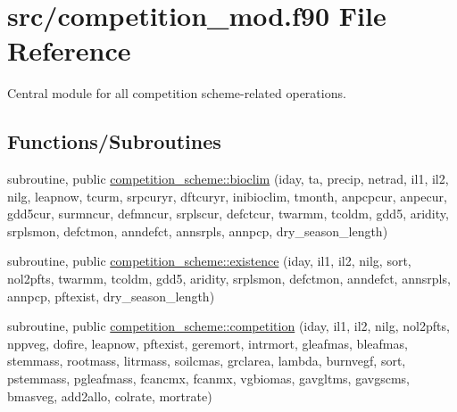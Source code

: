 \hypertarget{competition__mod_8f90}{}\section{src/competition\+\_\+mod.f90 File Reference}
\label{competition__mod_8f90}


Central module for all competition scheme-\/related operations.  


\subsection*{Functions/\+Subroutines}
{\bf }\par
\begin{DoxyCompactItemize}
\item 
subroutine, public \hyperlink{group__competition__scheme__bioclim_ga8976936d6f76c8619f6602153b8355f9}{competition\+\_\+scheme\+::bioclim} (iday, ta, precip, netrad, il1, il2, nilg, leapnow, tcurm, srpcuryr, dftcuryr, inibioclim, tmonth, anpcpcur, anpecur, gdd5cur, surmncur, defmncur, srplscur, defctcur, twarmm, tcoldm, gdd5, aridity, srplsmon, defctmon, anndefct, annsrpls, annpcp, dry\+\_\+season\+\_\+length)
\end{DoxyCompactItemize}

{\bf }\par
\begin{DoxyCompactItemize}
\item 
subroutine, public \hyperlink{group__competition__scheme__existence_ga4345a1807f52b8da4f0cdd9f0f71f91f}{competition\+\_\+scheme\+::existence} (iday, il1, il2, nilg, sort, nol2pfts, twarmm, tcoldm, gdd5, aridity, srplsmon, defctmon, anndefct, annsrpls, annpcp, pftexist, dry\+\_\+season\+\_\+length)
\end{DoxyCompactItemize}

{\bf }\par
\begin{DoxyCompactItemize}
\item 
subroutine, public \hyperlink{group__competition__scheme__competition_ga008cbfcefd33aaccb8f2b81cf8326451}{competition\+\_\+scheme\+::competition} (iday, il1, il2, nilg, nol2pfts, nppveg, dofire, leapnow, pftexist, geremort, intrmort, gleafmas, bleafmas, stemmass, rootmass, litrmass, soilcmas, grclarea, lambda, burnvegf, sort, pstemmass, pgleafmass, fcancmx, fcanmx, vgbiomas, gavgltms, gavgscms, bmasveg, add2allo, colrate, mortrate)
\end{DoxyCompactItemize}



